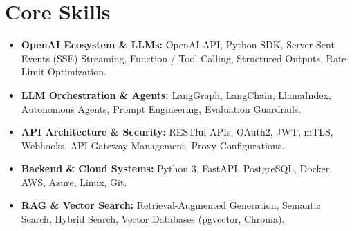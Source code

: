 \documentclass[a4paper,10pt]{article}
\begin{document}
\section{Core Skills}
\begin{itemize}
  \item \textbf{OpenAI Ecosystem \& LLMs:} OpenAI API, Python SDK, Server-Sent Events (SSE) Streaming, Function / Tool Calling, Structured Outputs, Rate Limit Optimization.
  \item \textbf{LLM Orchestration \& Agents:} LangGraph, LangChain, LlamaIndex, Autonomous Agents, Prompt Engineering, Evaluation Guardrails.
  \item \textbf{API Architecture \& Security:} RESTful APIs, OAuth2, JWT, mTLS, Webhooks, API Gateway Management, Proxy Configurations.
  \item \textbf{Backend \& Cloud Systems:} Python 3, FastAPI, PostgreSQL, Docker, AWS, Azure, Linux, Git.
  \item \textbf{RAG \& Vector Search:} Retrieval-Augmented Generation, Semantic Search, Hybrid Search, Vector Databases (pgvector, Chroma).
\end{itemize}
\end{document}
